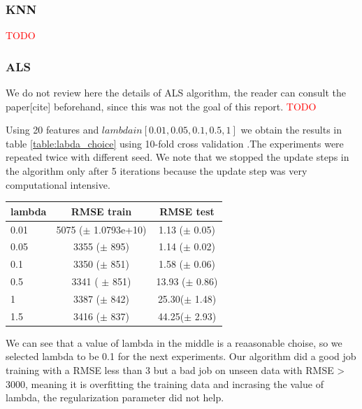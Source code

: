 \subsubsection{KNN}
\textcolor{red}{TODO}


\subsubsection{ALS}
We do not review here the details of ALS algorithm, the reader can consult the paper[cite] beforehand, since this was not the goal of this report.
\textcolor{red}{TODO}

Using 20 features and $lambda in [0.01,0.05,0.1,0.5,1]$ we obtain the results in table \ref{table:labda_choice} using 10-fold cross validation .The experiments were repeated twice with different seed. We note that we stopped the update steps in the algorithm only after 5 iterations because the update step was very computational intensive.
\begin{center}
  \begin{tabular}{ |l | c | c| }
    \hline
     lambda & RMSE train & RMSE test \\ \hline
     0.01   & 5075 ($\pm$  1.0793e+10) & 1.13 ($\pm$ 0.05) \\ \hline
     0.05  &  3355 ($\pm$  895)            &                1.14 ($\pm$  0.02)                   \\ \hline
     0.1     & 3350 ($\pm$ 851)  & 1.58 ($\pm$ 0.06) \\ \hline
     0.5    & 3341  ( $\pm$ 851)   &13.93 ($\pm$ 0.86)\\ \hline
     1       & 3387 ($\pm$ 842)   &25.30($\pm$ 1.48)\\ \hline
     1.5    & 3416 ($\pm$ 837) & 44.25($\pm$ 2.93) \\
    \hline
  \end{tabular}
  	\label{table:labda_choice}
\end{center}
We can see that a value of lambda in the middle is a reaasonable choise, so we selected lambda to be 0.1 for the next experiments.
Our algorithm did a good job training  with a RMSE less than  3 but a bad job on unseen data with RMSE > 3000, meaning it is overfitting 
the training data and incrasing the value of lambda, the regularization parameter did not help.


